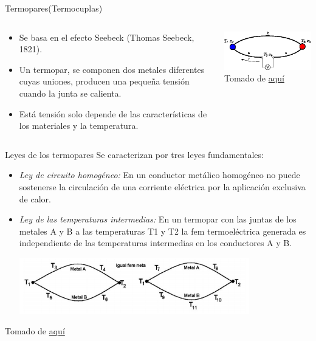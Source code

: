 \documentclass[aspectratio=169]{beamer}
\begin{document}
\begin{frame}{Termopares(Termocuplas)}
    \begin{columns}[c, onlytextwidth]
        \begin{column}{0.55\textwidth}
            \begin{itemize}
                \item Se basa en el efecto Seebeck (Thomas Seebeck, 1821). 
                \item Un termopar, se componen dos metales diferentes cuyas uniones, producen una pequeña tensión cuando la junta se calienta. 
                \item Está tensión solo depende de las características de los materiales y la temperatura. 
            \end{itemize}
        \end{column}
        \begin{column}{0.40\textwidth}
        \includegraphics[width=6cm]{fig/seebeekc.png}
            \tiny{Tomado de \href{https://www.iue.tuwien.ac.at/phd/mwagner/node14.html}{aquí}}
        \end{column}
    \end{columns}
\end{frame}

\begin{frame}{Leyes de los termopares}
    Se caracterizan por tres leyes fundamentales:\\[8pt]
    \begin{itemize}
        \item \emph{Ley de circuito homogéneo: } En un conductor metálico homogéneo no puede sostenerse la circulación de una corriente eléctrica por la aplicación exclusiva de calor.
        \item \emph{Ley de las temperaturas intermedias: } En un termopar con las juntas de los metales A y B a las temperaturas T1 y T2 la fem termoeléctrica generada es independiente de las temperaturas intermedias en los conductores A y B.
        \begin{center}
            \includegraphics[width=10cm]{fig/ley2.PNG}
        \end{center}
    \end{itemize}
    \tiny{Tomado de \href{http://laboratorios.fi.uba.ar/lscm/termocuplas01.pdf}{aquí}}
\end{frame}
\end{document}

